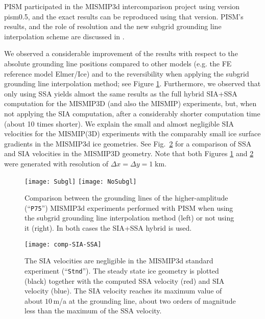 PISM participated in the MISMIP3d intercomparison project \cite{MISMIP3d2013} using version pism0.5, and the exact results can be reproduced using that version.  PISM's results, and the role of resolution and the new subgrid grounding line interpolation scheme are discussed in \cite{Feldmannetal2014}.

We observed a considerable improvement of the results with respect to the absolute grounding line positions compared to other models (e.g. the FE reference model Elmer/Ice) and to the reversibility when applying the subgrid grounding line interpolation method; see Figure \ref{fig:Subgl}.  Furthermore, we observed that only using SSA yields almost the same results as the full hybrid SIA+SSA computation for the MISMIP3D (and also the MISMIP) experiments, but, when not applying the SIA computation, after a considerably shorter computation time (about 10 times shorter).  We explain the small and almost negligible SIA velocities for the MISMIP(3D) experiments with the comparably small ice surface gradients in the MISMIP3d ice geometries.  See Fig.~\ref{fig:compSIASSA} for a comparison of SSA and SIA velocities in the MISMIP3D geometry.  Note that both Figures \ref{fig:Subgl} and \ref{fig:compSIASSA} were generated with resolution of $\Delta x = \Delta y = 1\;$km.

\begin{figure}[ht]
\centering
\texttt{[image: Subgl]}
\texttt{[image: NoSubgl]}
\caption{Comparison between the grounding lines of the higher-amplitude (``\texttt{P75}'') MISMIP3d experiments performed with PISM when using the subgrid grounding line interpolation method (left) or not using it (right).  In both cases the SIA+SSA hybrid is used.}
\label{fig:Subgl}
\end{figure}

\begin{figure}[ht]
\centering
\texttt{[image: comp-SIA-SSA]}
\caption{The SIA velocities are negligible in the MISMIP3d standard experiment (``\texttt{Stnd}'').  The steady state ice geometry is plotted (black) together with the computed SSA velocity (red) and SIA velocity (blue). The SIA velocity reaches its maximum value of about $10\,$m/a at the grounding line, about two orders of magnitude less than the maximum of the SSA velocity.}
\label{fig:compSIASSA}
\end{figure}

